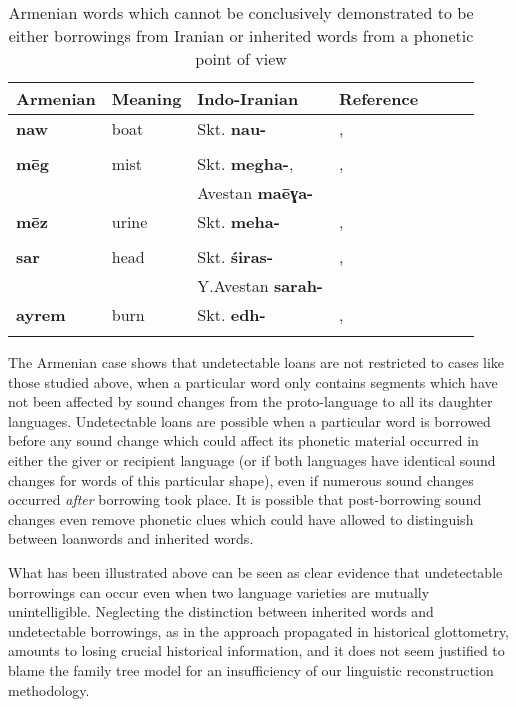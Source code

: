 \documentclass[svgnames,12pt]{scrartcl}
\newcommand{\ipa}[1]{\textbf{{\phon\mbox{#1}}}}
\begin{document}
\begin{table}[h]
\caption{Armenian words which cannot be conclusively demonstrated to be either borrowings from Iranian or inherited words from a phonetic point of view    } \centering \label{tab:armenian}
\begin{tabular}{lllllll}
\toprule 
Armenian & Meaning & Indo-Iranian & Reference \\
\midrule 
\ipa{naw}& boat & Skt. \ipa{nau-} & \citet[16-17;201]{huebschmann97armenische},\\
&&& \citet[466;715]{martirosyan10etymological} \\
\midrule 
\ipa{mēg}& mist & Skt. \ipa{megha-},  & \citet[474]{huebschmann97armenische},\\
&&Avestan \ipa{maēɣa-}& \citet[466;715]{martirosyan10etymological} \\
\midrule 
\ipa{mēz}& urine & Skt. \ipa{meha-} & \citet[474]{huebschmann97armenische},\\
&&& \citet[466;715]{martirosyan10etymological} \\
\midrule 
\ipa{sar}& head & Skt. \ipa{śiras-} & \citet[236;489]{huebschmann97armenische},\\
&&Y.Avestan \ipa{sarah-}& \citet[571]{martirosyan10etymological} \\
\midrule 
\ipa{ayrem}& burn & Skt. \ipa{edh-} & \citet[418]{huebschmann97armenische},\\
&&& \citet[145]{martzloff16geri} \\
\bottomrule
\end{tabular}
\end{table}
 
The Armenian case shows that undetectable loans are not restricted to cases like those studied above, when a particular word only contains segments which have not been affected by sound changes from the proto-language to all its daughter languages. Undetectable loans are possible when a particular word is borrowed before any sound change which could affect its phonetic material occurred in either the giver or recipient language (or if both languages have identical sound changes for words of this particular shape), even if numerous sound changes occurred \textit{after} borrowing took place. It is possible that post-borrowing sound changes even remove phonetic clues which could have allowed to distinguish between loanwords and inherited words.

What has been illustrated above can be seen as clear evidence that undetectable borrowings can occur even when two language varieties are mutually unintelligible. Neglecting the distinction between inherited words and undetectable borrowings, as in the approach propagated in historical glottometry, amounts to losing crucial historical information, and it does not seem justified to blame the family tree model for an insufficiency of our linguistic reconstruction methodology.
\end{document}
